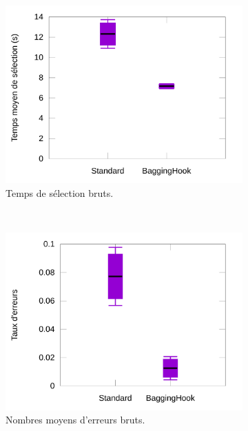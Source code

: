 	\begin{figure}[htb]
		\begin{subfigure}[t]{0.49\textwidth}
			\centering
			\includegraphics[width=\textwidth]{figures/ch5/baggingRawTimes}
			\caption{Temps de sélection bruts.}
			\label{fig:baggingRawTimes}
		\end{subfigure}
		~
		\begin{subfigure}[t]{0.49\textwidth}
			\centering
			\includegraphics[width=\textwidth]{figures/ch5/baggingRawErrors}
			\caption{Nombres moyens d'erreurs bruts.}
			\label{fig:baggingRawErrors}
		\end{subfigure}
		~
		\begin{subfigure}[t]{0.49\textwidth}
			\centering

\end{subfigure}
\end{figure}
